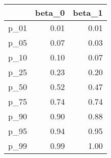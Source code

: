 \begin{table}[ht]
\centering
\begin{tabular}{rrr}
  \hline
 & beta\_0 & beta\_1 \\ 
  \hline
p\_01 & 0.01 & 0.01 \\ 
  p\_05 & 0.07 & 0.03 \\ 
  p\_10 & 0.10 & 0.07 \\ 
  p\_25 & 0.23 & 0.20 \\ 
  p\_50 & 0.52 & 0.47 \\ 
  p\_75 & 0.74 & 0.74 \\ 
  p\_90 & 0.90 & 0.88 \\ 
  p\_95 & 0.94 & 0.95 \\ 
  p\_99 & 0.99 & 1.00 \\ 
   \hline
\end{tabular}
\end{table}

